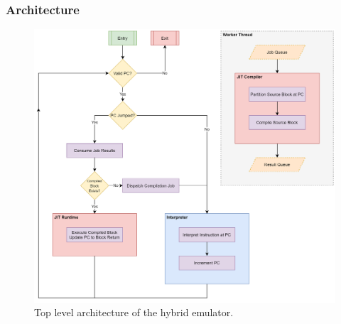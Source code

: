 \subsubsection{Architecture}
\label{section:hybrid-arch}



\begin{figure}[h]
    \centering
    \includegraphics[width=1\linewidth]{diagrams/hybrid.png}
    \caption{Top level architecture of the hybrid emulator.}
    \label{figure:hybrid-arch}
\end{figure}